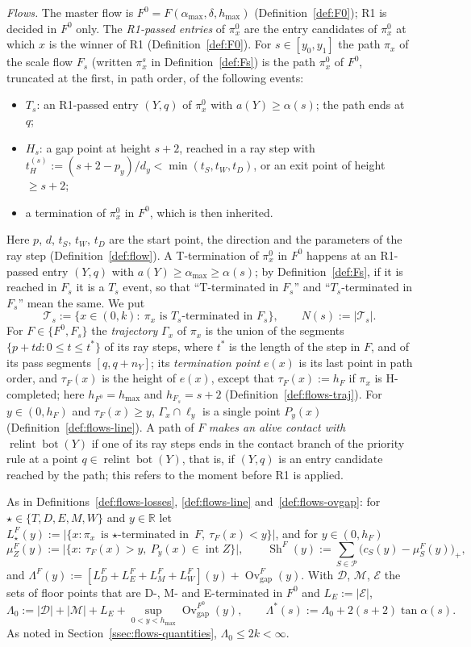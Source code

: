 \documentclass[11pt]{amsart}
\newcommand{\R}{\mathbb R}
\newcommand{\cP}{\mathcal P}
\newcommand{\cD}{\mathcal D}
\newcommand{\cM}{\mathcal M}
\newcommand{\cE}{\mathcal E}
\newcommand{\cT}{\mathcal T}
\newcommand{\relint}{\operatorname{relint}}
\newcommand{\Bot}{\operatorname{bot}}
\newcommand{\Sh}{\operatorname{Sh}}
\newcommand{\Ovgap}{\operatorname{Ov}_{\mathrm{gap}}}
\newcommand{\amax}{\alpha_{\max}}
\newcommand{\hmax}{h_{\max}}
\newcommand{\Fz}{F^{0}}
\newcommand{\Fs}{F_{s}}
\theoremstyle{definition}
\theoremstyle{remark}
\numberwithin{equation}{section}
\begin{document}
\emph{Flows.} The master flow is $\Fz=F(\amax,\delta,\hmax)$ (Definition~\ref{def:F0}); R1 is decided in $\Fz$ only. The \emph{R1-passed entries} of $\pi^0_x$ are the entry candidates of $\pi^0_x$ at which $x$ is the winner of R1 (Definition~\ref{def:F0}). For $s\in[y_0,y_1]$ the path $\pi_x$ of the scale flow $\Fs$ (written $\pi^s_x$ in Definition~\ref{def:Fs}) is the path $\pi^0_x$ of $\Fz$, truncated at the first, in path order, of the following events:
\begin{itemize}
\item[(a)] $T_s$: an R1-passed entry $(Y,q)$ of $\pi^0_x$ with $a(Y)\ge\alpha(s)$; the path ends at $q$;
\item[(b)] $H_s$: a gap point at height $s+2$, reached in a ray step with $t_H^{(s)}:=(s+2-p_y)/d_y<\min(t_S,t_W,t_D)$, or an exit point of height $\ge s+2$;
\item[(c)] a termination of $\pi^0_x$ in $\Fz$, which is then inherited.
\end{itemize}
Here $p$, $d$, $t_S$, $t_W$, $t_D$ are the start point, the direction and the parameters of the ray step (Definition~\ref{def:flow}). A T-termination of $\pi^0_x$ in $\Fz$ happens at an R1-passed entry $(Y,q)$ with $a(Y)\ge\amax\ge\alpha(s)$; by Definition~\ref{def:Fs}, if it is reached in $\Fs$ it is a $T_s$ event, so that ``T-terminated in $\Fs$'' and ``$T_s$-terminated in $\Fs$'' mean the same. We put
\[
\cT_s:=\{x\in(0,k):\ \pi_x\text{ is $T_s$-terminated in }\Fs\},\qquad N(s):=|\cT_s| .
\]
For $F\in\{\Fz,\Fs\}$ the \emph{trajectory} $\Gamma_x$ of $\pi_x$ is the union of the segments $\{p+td:0\le t\le t^*\}$ of its ray steps, where $t^*$ is the length of the step in $F$, and of its pass segments $[q,q+n_Y]$; its \emph{termination point} $e(x)$ is its last point in path order, and $\tau_F(x)$ is the height of $e(x)$, except that $\tau_F(x):=h_F$ if $\pi_x$ is H-completed; here $h_{\Fz}=\hmax$ and $h_{\Fs}=s+2$ (Definition~\ref{def:flows-traj}). For $y\in(0,h_F)$ and $\tau_F(x)\ge y$, $\Gamma_x\cap\ell_y$ is a single point $P_y(x)$ (Definition~\ref{def:flows-line}). A path of $F$ \emph{makes an alive contact with $\relint\Bot(Y)$} if one of its ray steps ends in the contact branch of the priority rule at a point $q\in\relint\Bot(Y)$, that is, if $(Y,q)$ is an entry candidate reached by the path; this refers to the moment before R1 is applied.

As in Definitions~\ref{def:flows-losses}, \ref{def:flows-line} and~\ref{def:flows-ovgap}: for $\star\in\{T,D,E,M,W\}$ and $y\in\R$ let $L^F_\star(y):=|\{x:\pi_x\text{ is $\star$-terminated in }F,\ \tau_F(x)<y\}|$, and for $y\in(0,h_F)$
\[
\mu^F_Z(y):=\big|\{x:\ \tau_F(x)>y,\ P_y(x)\in\operatorname{int}Z\}\big|,\qquad \Sh^F(y):=\sum_{S\in\cP}\big(c_S(y)-\mu^F_S(y)\big)_+,
\]
and $\Lambda^F(y):=[L^F_D+L^F_E+L^F_M+L^F_W](y)+\Ovgap^F(y)$. With $\cD$, $\cM$, $\cE$ the sets of floor points that are D-, M- and E-terminated in $\Fz$ and $L_E:=|\cE|$,
\[
\Lambda_0:=|\cD|+|\cM|+L_E+\sup_{0<y<\hmax}\Ovgap^{\Fz}(y),\qquad \Lambda^*(s):=\Lambda_0+2(s+2)\tan\alpha(s).
\]
As noted in Section~\ref{ssec:flows-quantities}, $\Lambda_0\le2k<\infty$.
\end{document}
